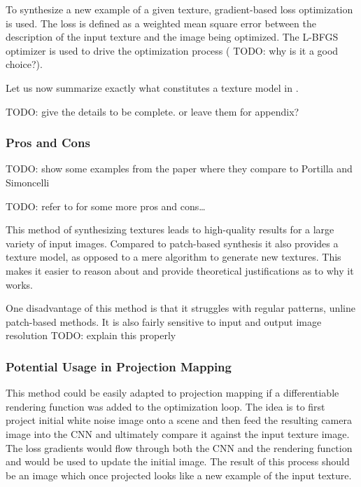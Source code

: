 To synthesize a new example of a given texture, gradient-based loss optimization is used. The loss is defined as a weighted mean square error between the description of the input texture and the image being optimized. The L-BFGS optimizer is used to drive the optimization process ({\color{red} TODO: why is it a good choice?}).

Let us now summarize exactly what constitutes a texture model in \citet{Gatys2015}.

{\color{red} TODO: give the details to be complete. or leave them for appendix?}

\subsubsection{Pros and Cons}
\label{section:background-texture_synthesis-statistics_based-pros_and_cons}

{\color{red} TODO: show some examples from the paper where they compare to Portilla and Simoncelli}

{\color{red} TODO: refer to \citet{Raad2018} for some more pros and cons\dots}

This method of synthesizing textures leads to high-quality results for a large variety of input images. Compared to patch-based synthesis it also provides a texture model, as opposed to a mere algorithm to generate new textures. This makes it easier to reason about and provide theoretical justifications as to why it works.

One disadvantage of this method is that it struggles with regular patterns, unline patch-based methods. It is also fairly sensitive to input and output image resolution {\color{red} TODO: explain this properly}

\subsubsection{Potential Usage in Projection Mapping}
\label{section:background-texture_synthesis-statistics_based-projection_mapping}

This method could be easily adapted to projection mapping if a differentiable rendering function was added to the optimization loop. The idea is to first project initial white noise image onto a scene and then feed the resulting camera image into the CNN and ultimately compare it against the input texture image. The loss gradients would flow through both the CNN and the rendering function and would be used to update the initial image. The result of this process should be an image which once projected looks like a new example of the input texture.